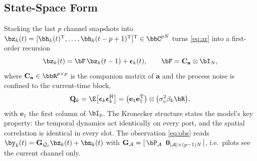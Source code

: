 \subsection{State-Space Form}
Stacking the last $p$ channel snapshots into
$\bz_k(t)=[\bh_k(t)^{\mathrm{T}},\dots,\bh_k(t-p+1)^{\mathrm{T}}]^{\mathrm{T}}
\in\bbC^{pN}$ turns \eqref{eq:ar} into a first-order recursion
\begin{equation}
  \bz_k(t) = \bF\,\bz_k(t-1) + \boldsymbol{\epsilon}_k(t),
  \qquad
  \bF = \mathbf{C}_{\mathbf{a}}\otimes\bI_N,
  \label{eq:state}
\end{equation}
where $\mathbf{C}_{\mathbf{a}}\in\bbR^{p\times p}$ is the companion matrix of
$\mathbf{a}$ and the process noise is confined to the current-time block,
\begin{equation}
  \mathbf{Q}_k
  = \E\big[\boldsymbol{\epsilon}_k\boldsymbol{\epsilon}_k^{\mathrm{H}}\big]
  = \big(\mathbf{e}_1\mathbf{e}_1^{\mathrm{T}}\big)
    \otimes\big(\sigma_v^2\beta_k\bR\big),
  \label{eq:Q}
\end{equation}
with $\mathbf{e}_1$ the first column of $\bI_p$. The Kronecker structure states
the model's key property: the temporal dynamics act identically on every port,
and the spatial correlation is identical in every slot. The observation
\eqref{eq:obs} reads $\by_k(t)=\mathbf{G}_{\mathcal{Q}_t}\bz_k(t)+\bn_k(t)$
with $\mathbf{G}_{\mathcal{A}}=[\,\bP_{\mathcal{A}}\;\;
\mathbf{0}_{|\mathcal{A}|\times(p-1)N}\,]$, i.e.\ pilots see the current
channel only.

